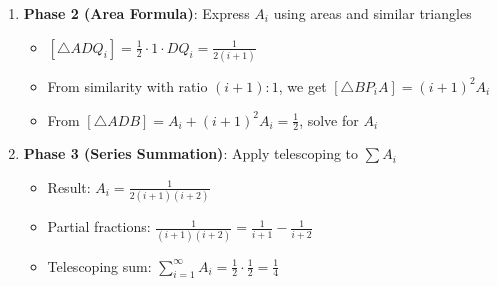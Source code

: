 \documentclass[]{article}
\begin{document}
\begin{techniquesbox}
\begin{enumerate}
    \item \textbf{Phase 2 (Area Formula)}: Express $A_i$ using areas and similar triangles
    \begin{itemize}
        \item $[\triangle ADQ_i] = \frac{1}{2} \cdot 1 \cdot DQ_i = \frac{1}{2(i+1)}$
        \item From similarity with ratio $(i+1):1$, we get $[\triangle BP_iA] = (i+1)^2 A_i$
        \item From $[\triangle ADB] = A_i + (i+1)^2 A_i = \frac{1}{2}$, solve for $A_i$
    \end{itemize}
    
    \item \textbf{Phase 3 (Series Summation)}: Apply telescoping to $\sum A_i$
    \begin{itemize}
        \item Result: $A_i = \frac{1}{2(i+1)(i+2)}$
        \item Partial fractions: $\frac{1}{(i+1)(i+2)} = \frac{1}{i+1} - \frac{1}{i+2}$
        \item Telescoping sum: $\sum_{i=1}^{\infty} A_i = \frac{1}{2} \cdot \frac{1}{2} = \frac{1}{4}$
    \end{itemize}
\end{enumerate}
\end{techniquesbox}
\end{document}

